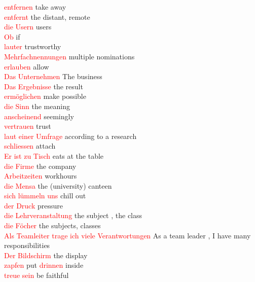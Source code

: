 \documentclass{article}
\begin{document}
	\textcolor{red}{entfernen} take away\\
	\textcolor{red}{entfernt}  the distant, remote\\
	\textcolor{red}{die Usern} users\\
	\textcolor{red}{Ob} if\\
	\textcolor{red}{lauter} trustworthy\\
	\textcolor{red}{Mehrfachnennungen} multiple nominations\\
	\textcolor{red}{erlauben} allow\\
	\textcolor{red}{Das Unternehmen} The business\\
	\textcolor{red}{Das Ergebnisse} the result\\
	\textcolor{red}{ermöglichen} make possible\\
	\textcolor{red}{die Sinn} the meaning\\
	\textcolor{red}{anscheinend} seemingly\\
	\textcolor{red}{vertrauen} trust\\
	\textcolor{red}{laut einer Umfrage} according to a research\\
	\textcolor{red}{schliessen} attach\\
	\textcolor{red}{Er ist zu Tisch} eats at the table\\
	\textcolor{red}{die Firme} the company\\
	\textcolor{red}{Arbeitzeiten} workhours\\
	\textcolor{red}{die Mensa} the (university) canteen\\
	\textcolor{red}{sich lümmeln uns} chill out\\
	\textcolor{red}{der Druck} pressure\\
	\textcolor{red}{die Lehrveranstaltung} the subject , the class\\
	\textcolor{red}{die Föcher} the subjects, classes\\
	\textcolor{red}{Als Teamleiter trage ich viele Verantwortungen} As a team leader , I have many responsibilities\\
	\textcolor{red}{Der Bildschirm} the display\\
	\textcolor{red}{zapfen} put
	\textcolor{red}{drinnen} inside\\
	\textcolor{red}{treue sein} be faithful \\\\
	
\end{document}

